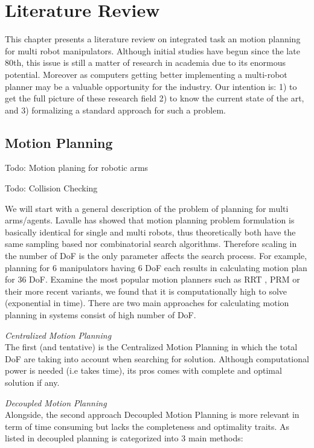 

\section{Literature Review}

This chapter presents a literature review on integrated task an motion planning for multi robot manipulators. Although initial studies have begun since the late 80th, this issue is still a matter of research in academia due to its enormous potential. Moreover as computers getting better implementing a multi-robot planner may be a valuable opportunity for the industry. Our intention is: 1) to get the full picture of these research field 2) to know the current state of the art, and 3) formalizing a standard approach for such a problem.


\subsection{Motion Planning}
\label{section:motion_planning}

Todo: Motion planing for robotic arms

Todo: Collision Checking

We will start with a general description of the problem of planning for multi arms/agents. Lavalle \cite{lavalle2006planning} 
has showed that motion planning problem formulation  is basically identical for single and multi robots, thus theoretically both have the same sampling based nor combinatorial search algorithms. Therefore scaling in the number of DoF is the only parameter affects the search process. For example, planning for 6 manipulators having 6 DoF each results in calculating motion plan for 36 DoF. Examine the most popular motion planners such as RRT \cite{lavalle1998rapidly}, PRM \cite{kavraki1996probabilistic} 
or their more recent variants, we found that it is computationally high to solve (exponential in time). There are two main approaches for calculating motion planning in systems consist of high number of DoF. 


\textit{Centralized Motion Planning} \\
The first (and tentative) is the Centralized Motion Planning in which the total DoF are taking into account when searching for solution. Although computational power is needed (i.e takes time), its pros comes with complete and optimal solution if any.

\textit{Decoupled Motion Planning} \\
Alongside, the second approach Decoupled Motion Planning is more relevant in term of time consuming but lacks the completeness and optimality traits. As listed in \cite{smith2012dual,lavalle2006planning} decoupled planning is categorized into 3 main methods:
	


